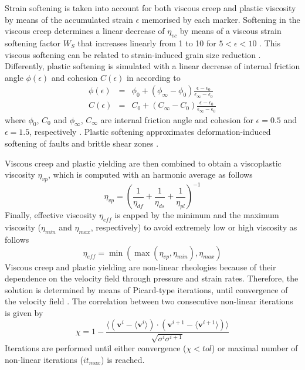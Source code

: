 \documentclass[hidelinks,11pt,a4paper]{article}
\begin{document}
Strain softening is taken into account for both viscous creep and plastic viscosity \citep{Huismans2003,Babeyko2005,Huismans2005,Sobolev2005,Warren2008a} by means of the accumulated strain $\epsilon$ memorised by each marker. Softening in the viscous creep determines a linear decrease of $\eta_{vc}$ by means of a viscous strain softening factor $W_S$ that increases linearly from 1 to 10 for $5<\epsilon<10$ \citep{Warren2008a}. This viscous softening can be related to strain-induced grain size reduction \citep{Warren2008a}. Differently, plastic softening is simulated with a linear decrease of internal friction angle $\phi(\epsilon)$ and cohesion $C(\epsilon)$ in according to
\begin{eqnarray}
\label{eq:friction1}\phi(\epsilon)&=&\phi_0+(\phi_{\infty}-\phi_0)\frac{\epsilon-\epsilon_0}{\epsilon_{\infty}-\epsilon_0}\\
\label{eq:friction2}C(\epsilon)&=&C_0+(C_{\infty}-C_0)\frac{\epsilon-\epsilon_0}{\epsilon_{\infty}-\epsilon_0}
\end{eqnarray}
where $\phi_0$, $C_0$ and $\phi_{\infty}$, $C_{\infty}$ are internal friction angle and cohesion for $\epsilon=0.5$ and $\epsilon=1.5$, respectively \citep{Huismans2003,Huismans2005,Warren2008a,Thieulot2014}. Plastic softening approximates deformation-induced softening of faults and brittle shear zones \citep{Warren2008a}.

Viscous creep and plastic yielding are then combined to obtain a viscoplastic viscosity $\eta_{vp}$, which is computed with an harmonic average \citep{Tackley2010,Glerum2018} as follows
\begin{equation}\label{eq:viscoplastic}
\eta_{vp}=\left(\frac{1}{\eta_{df}}+\frac{1}{\eta_{ds}}+\frac{1}{\eta_{pl}}\right)^{-1}
\end{equation}
Finally, effective viscosity $\eta_{eff}$ is capped by the minimum and the maximum viscosity ($\eta_{min}$ and $\eta_{max}$, respectively) to avoid extremely low or high viscosity \citep{Glerum2018} as follows
\begin{equation}\label{eq:effective}
\eta_{eff}=\min(\max(\eta_{vp},\eta_{min}),\eta_{max})
\end{equation}
Viscous creep and plastic yielding are non-linear rheologies because of their dependence on the velocity field through pressure and strain rates. Therefore, the solution is determined by means of Picard-type iterations, until convergence of the velocity field \citep{Thieulot2011}. The correlation between two consecutive non-linear iterations is given by
\begin{equation}\label{eq:convergence}
\chi=1-\frac{\langle (\bm{v}^i-\langle\bm{v}^i\rangle)\cdot (\bm{v}^{i+1}-\langle\bm{v}^{i+1}\rangle) \rangle}{\sqrt{\sigma^i\sigma^{i+1}}}
\end{equation}
Iterations are performed until either convergence ($\chi<tol$) or maximal number of non-linear iterations ($it_{max}$) is reached.
\end{document}
